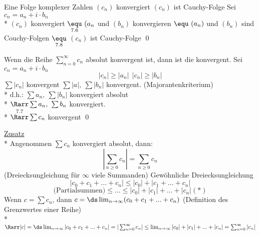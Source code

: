 
Eine Folge komplexer Zahlen $(c_n)$ konvergiert \equ{} $(c_n)$ ist Cauchy-Folge
\bew
	Sei $c_n = a_n + i \cdot b_n$\\*
	$(c_n)$ konvergiert $\underset{7.6}{\equ} \ (a_n$ und $(b_n)$ konvergieren $\equ \ (a_n)$ und $(b_n)$ sind Couchy-Folgen $\underset{7.8}{\equ}$ $(c_n)$ ist Cauchy-Folge \qed


Wenn die Reihe $\sum_{n = 0}^{\infty} c_n$ absolut konvergent ist, dann ist die konvergent.
\bew
Sei $c_n = a_n + i \cdot b_n$ $$|c_n| \geq |a_n|\ \ |c_n| \geq |b_n|$$
$\sum |c_n|$ konvergent \Rarr $\sum |a|,\ \sum |b_n|$ konvergent. (Majorantenkriterium)\\*
d.h.: $\sum a_n,\ \sum |b_n|$ konvergiert absolut\\*
$\Rarr \sum a_n,\ \sum b_n$ konvergiert.\\*
$\overset{7.7}{\Rarr} \sum c_n$ konvergent \qed

\ul{Zusatz}\\*
Angenommen $\sum c_n$ konvergiert absolut, dann: 
$$|\sum_{n \geq 0} c_n| = \sum_{n \geq 0} c_n$$
(Dreiecksungleichung für $\infty$ viele Summanden)
\bew
Gewöhnliche Dreiecksungleichung \Rarr
$$|c_0 + c_1 + ... + c_n| \leq |c_0| + |c_1 + ... + c_n|$$
$$\text{(Partialsummen)} \leq ... \leq |c_0| + |c_1| + ... + |c_n| (*)$$
Wenn $c = \sum c_n$, dann $c = \ds\lim_{n \to \infty} (c_0 + c_1 + ... + c_n)$ (Definition des Grenzwertes einer Reihe)\\*
$\Rarr |c| = \ds\lim_{n \to \infty} |c_0 + c_1 + ... + c_n| = |\sum_{n = 0}^{\infty} c_n| \leq \lim_{n \to \infty} |c_0| + |c_1| + ... + |c_n| = \sum_{n = 0}^{\infty} |c_n|$